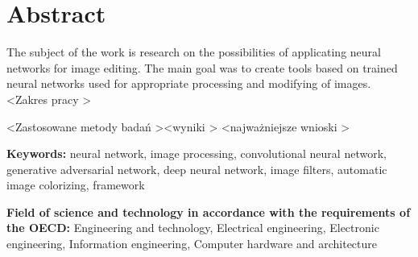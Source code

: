 \section*{Abstract}
  The subject of the work is research on the possibilities of applicating
  neural networks for image editing. The main goal was to create tools based on
  trained neural networks used for appropriate processing and modifying of
  images. \textless Zakres pracy \textgreater

  \textless Zastosowane metody badań \textgreater \textless wyniki \textgreater
  \textless najważniejsze wnioski \textgreater

  \bigskip

  \noindent\textbf{Keywords:} neural network, image processing, convolutional
  neural network, generative adversarial network, deep neural network,
  image filters, automatic image colorizing, framework

  \bigskip

  \noindent\textbf{Field of science and technology in accordance with the
  requirements of the OECD:} Engineering and technology, Electrical engineering,
  Electronic engineering, Information engineering, Computer hardware and
  architecture
